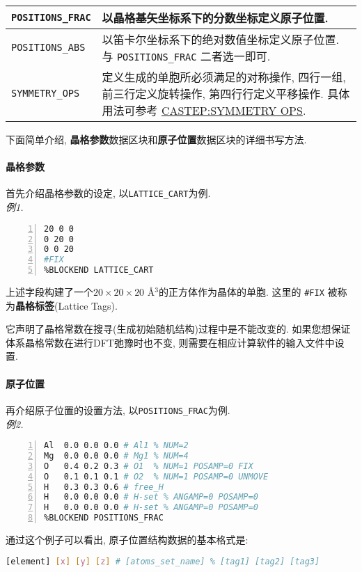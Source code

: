 \documentclass[a4paper, 10pt]{article}
\begin{document}
\begin{center}
\begin{longtable}{m{13em}<{\centering} | m{19em}}
\midrule
\verb|POSITIONS_FRAC| & 以晶格基矢坐标系下的分数坐标定义原子位置.\\
\midrule
\verb|POSITIONS_ABS| & 以笛卡尔坐标系下的绝对数值坐标定义原子位置. 与 \verb|POSITIONS_FRAC| 二者选一即可.\\
\midrule
\verb|SYMMETRY_OPS| & 定义生成的单胞所必须满足的对称操作, 四行一组, 前三行定义旋转操作, 第四行行定义平移操作. 具体用法可参考 \href{http://www.tcm.phy.cam.ac.uk/castep/documentation/WebHelp/content/modules/castep/keywords/k_symmetry_ops_castep.htm}{CASTEP:SYMMETRY OPS}.\\
\bottomrule
\end{longtable}
\end{center}

下面简单介绍, \textbf{晶格参数}数据区块和\textbf{原子位置}数据区块的详细书写方法.

\paragraph{晶格参数} 首先介绍晶格参数的设定, 以\verb|LATTICE_CART|为例.\\
\emph{例1.}
\begin{lstlisting}[language={bash},numbers=left]
%BLOCK LATTICE_CART
20 0 0
0 20 0
0 0 20
#FIX
%BLOCKEND LATTICE_CART
\end{lstlisting}

上述字段构建了一个\(20\times20\times20\) \r{A}\(^3\)的正方体作为晶体的单胞. 这里的 \verb|#FIX| 被称为\textbf{晶格标签}(Lattice Tags). 

它声明了晶格常数在搜寻(生成初始随机结构)过程中是不能改变的. 如果您想保证体系晶格常数在进行DFT弛豫时也不变, 则需要在相应计算软件的输入文件中设置.


\paragraph{原子位置} 再介绍原子位置的设置方法, 以\verb|POSITIONS_FRAC|为例.\\
\emph{例2.}
\begin{lstlisting}[language={bash},numbers=left]
%BLOCK POSITIONS_FRAC
Al  0.0 0.0 0.0 # Al1 % NUM=2 
Mg  0.0 0.0 0.0 # Mg1 % NUM=4 
O   0.4 0.2 0.3 # O1  % NUM=1 POSAMP=0 FIX
O   0.1 0.1 0.1 # O2  % NUM=1 POSAMP=0 UNMOVE
H   0.3 0.3 0.6 # free_H 
H   0.0 0.0 0.0 # H-set % ANGAMP=0 POSAMP=0
H   0.0 0.0 0.0 # H-set % ANGAMP=0 POSAMP=0
%BLOCKEND POSITIONS_FRAC
\end{lstlisting}

通过这个例子可以看出, 原子位置结构数据的基本格式是:
\begin{lstlisting}[language={bash}]
[element] [x] [y] [z] # [atoms_set_name] % [tag1] [tag2] [tag3]
\end{lstlisting}
\end{document}

